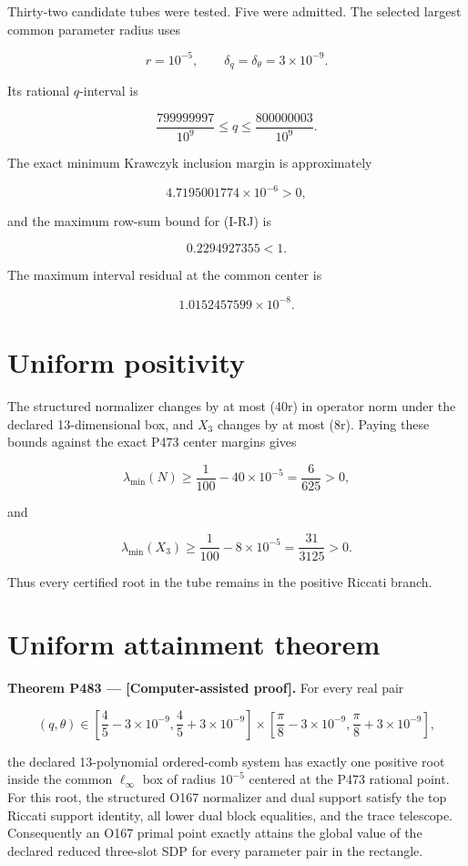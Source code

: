 \documentclass[11pt,a4paper,openany]{report}
\begin{document}
Thirty-two candidate tubes were tested. Five were admitted. The selected largest common parameter radius uses

\[
r=10^{-5},\qquad
\delta_q=\delta_\theta=3\times10^{-9}.
\]

Its rational \(q\)-interval is

\[
\frac{799999997}{10^9}
\le q\le
\frac{800000003}{10^9}.
\]

The exact minimum Krawczyk inclusion margin is approximately

\[
4.7195001774\times10^{-6}>0,
\]

and the maximum row-sum bound for (I-RJ) is

\[
0.2294927355<1.
\]

The maximum interval residual at the common center is

\[
1.0152457599\times10^{-8}.
\]

\section{Uniform positivity}

The structured normalizer changes by at most (40r) in operator norm under the declared 13-dimensional box, and \(X_3\) changes by at most (8r). Paying these bounds against the exact P473 center margins gives

\[
\lambda_{\min}(N)\ge
\frac1{100}-40\times10^{-5}
=\frac6{625}>0,
\]

and

\[
\lambda_{\min}(X_3)\ge
\frac1{100}-8\times10^{-5}
=\frac{31}{3125}>0.
\]

Thus every certified root in the tube remains in the positive Riccati branch.

\section{Uniform attainment theorem}

\textbf{Theorem P483 --- \textcolor{fingreen}{[Computer-assisted proof]}.} For every real pair

\[
(q,\theta)\in
\left[\frac45-3\times10^{-9},\frac45+3\times10^{-9}\right]
\times
\left[\frac\pi8-3\times10^{-9},\frac\pi8+3\times10^{-9}\right],
\]

the declared 13-polynomial ordered-comb system has exactly one positive root inside the common \(\ell_\infty\) box of radius \(10^{-5}\) centered at the P473 rational point. For this root, the structured O167 normalizer and dual support satisfy the top Riccati support identity, all lower dual block equalities, and the trace telescope. Consequently an O167 primal point exactly attains the global value of the declared reduced three-slot SDP for every parameter pair in the rectangle.
\end{document}
